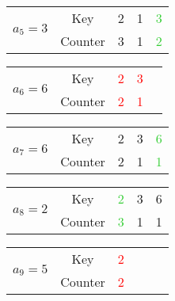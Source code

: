 \documentclass{article}
\newcommand{\MGinc}[1]{\textcolor{LimeGreen}{#1}}
\newcommand{\MGdec}[1]{\textcolor{Red}{#1}}
\begin{document}
\begin{center}
\begin{minipage}{0.45\textwidth}
\begin{center}
      \end{center}
    \end{minipage}
    \begin{minipage}{0.45\textwidth}
      \begin{center}
        \begin{tabular}{c|c|c|c|c|}
          \cline{2-5}
          \multirow{2}{*}{\textbf{\LARGE{$a_5=3$}}}
          & Key & 2 & 1 & \MGinc{3} \\\cline{2-5}
          & Counter & 3 & 1 & \MGinc{2} \\
          \cline{2-5}
        \end{tabular}\vspace{3mm}

        \begin{tabular}{c|c|c|c|c|}
          \cline{2-4}
          \multirow{2}{*}{\textbf{\LARGE{$a_6=6$}}}
          & Key & \MGdec{2} & \MGdec{3} \\\cline{2-4}
          & Counter & \MGdec{2} & \MGdec{1} \\
          \cline{2-4}
        \end{tabular}\vspace{3mm}

        \begin{tabular}{c|c|c|c|c|}
          \cline{2-5}
          \multirow{2}{*}{\textbf{\LARGE{$a_7=6$}}}
          & Key & 2 & 3 & \MGinc{6} \\\cline{2-5}
          & Counter & 2 & 1 & \MGinc{1} \\
          \cline{2-5}
        \end{tabular}\vspace{3mm}

        \begin{tabular}{c|c|c|c|c|}
          \cline{2-5}
          \multirow{2}{*}{\textbf{\LARGE{$a_8=2$}}}
          & Key & \MGinc{2} & 3 & 6 \\\cline{2-5}
          & Counter & \MGinc{3} & 1 & 1 \\
          \cline{2-5}
        \end{tabular}\vspace{3mm}

        \begin{tabular}{c|c|c|c|c|c|}
          \cline{2-3}
          \multirow{2}{*}{\textbf{\LARGE{$a_9=5$}}}
          & Key & \MGdec{2} \\\cline{2-3}
          & Counter & \MGdec{2} \\
          \cline{2-3}
        \end{tabular}
      \end{center}
    \end{minipage}
  \end{center}\vspace{3mm}
\end{document}
